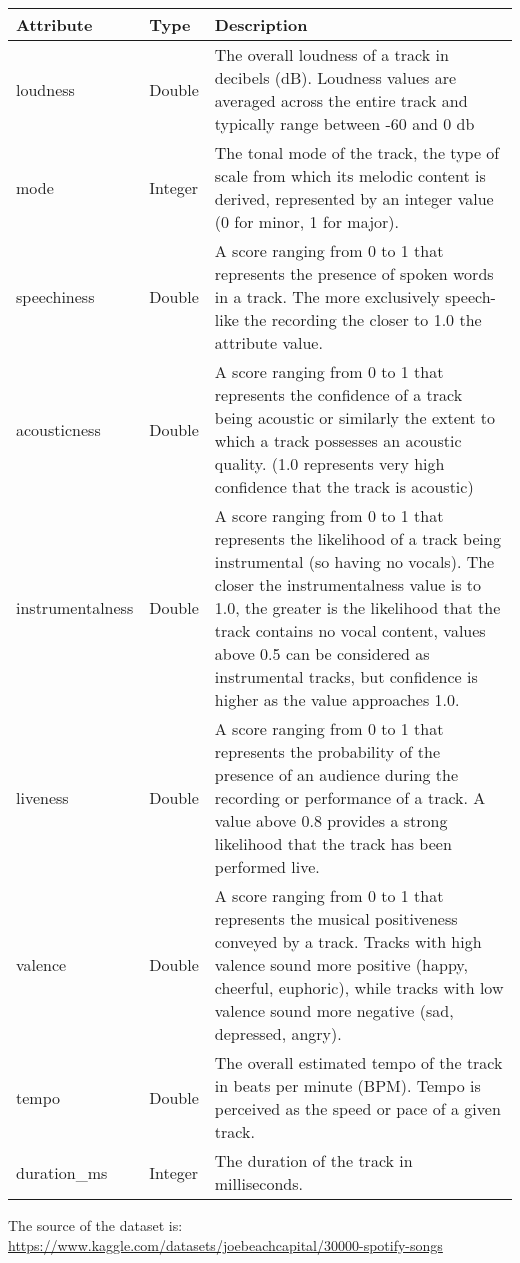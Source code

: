 \documentclass{Configuration_Files/PoliMi3i_thesis}
\begin{document}
\begin{table}[h!]
	\begin{center}
		\hspace*{-1cm}
		\begin{tabular}{|m{8em}|m{4em}|m{29em}|}
		\hline
		\textbf{Attribute} & \textbf{Type} & \textbf{Description}\\
		\hline
			loudness & Double & The overall loudness of a track in decibels (dB). Loudness values are averaged across the entire track and typically range between -60 and 0 db\\
		\hline
			mode & Integer & The tonal mode of the track, the type of scale from which its melodic content is derived, represented by an integer value (0 for minor, 1 for major).\\
		\hline
			speechiness & Double & A score ranging from 0 to 1 that represents the presence of spoken words in a track. The more exclusively speech-like the recording the closer to 1.0 the attribute value.\\
		\hline
			acousticness & Double & A score ranging from 0 to 1 that represents the confidence of a track being acoustic or similarly the extent to which a track possesses an acoustic quality. (1.0 represents very high confidence that the track is acoustic)\\
		\hline
			instrumentalness & Double & A score ranging from 0 to 1 that represents the likelihood of a track being instrumental (so having no vocals). The closer the instrumentalness value is to 1.0, the greater is the likelihood that the track contains no vocal content, values above 0.5 can be considered as instrumental tracks, but confidence is higher as the value approaches 1.0.\\
		\hline
			liveness & Double & A score ranging from 0 to 1 that represents the probability of the presence of an audience during the recording or performance of a track. A value above 0.8 provides a strong likelihood that the track has been performed live.\\
		\hline
			valence & Double & A score ranging from 0 to 1 that represents the musical positiveness conveyed by a track. Tracks with high valence sound more positive (happy, cheerful, euphoric), while tracks with low valence sound more negative (sad, depressed, angry).\\
		\hline
			tempo & Double & The overall estimated tempo of the track in beats per minute (BPM). Tempo is perceived as the speed or pace of a given track.\\
		\hline
			duration\_ms & Integer & The duration of the track in milliseconds.\\
		\hline
		\end{tabular}
		\hspace*{1cm}
	\end{center}
\end{table}
The source of the dataset is:\\
\url{https://www.kaggle.com/datasets/joebeachcapital/30000-spotify-songs}
\newpage
\end{document}
